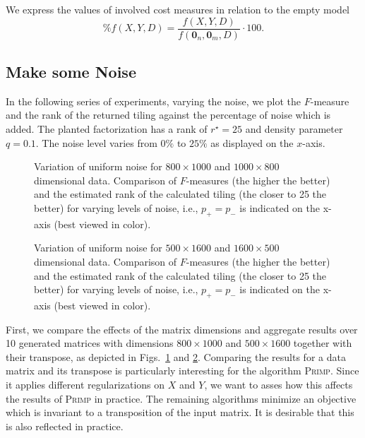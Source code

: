 We express the values of involved cost measures in relation to the empty model
\[
	\%f(X,Y,D) = \frac{f(X,Y,D)}{f(\mathbf{0}_n,\mathbf{0}_m,D)}\cdot 100.
\]
\subsection{Make some Noise}
In the following series of experiments, varying the noise, we plot the $F$-measure and the rank of the returned tiling against the percentage of noise which is added. The planted factorization has a rank of $r^\star=25$ and density parameter $q=0.1$. The noise level varies from $0\%$ to $25\%$ as displayed on the $x$-axis.  
\begin{figure}
\centering

\caption{Variation of uniform noise for $800\times 1000$ and $1000\times 800$ dimensional data. Comparison of $F$-measures (the higher the better) and the estimated rank of the calculated tiling (the closer to 25 the better) for varying levels of noise, i.e., $p_+=p_-$ is indicated on the x-axis (best viewed in color).}
\label{fig:noise810}
\end{figure}
\begin{figure}
\centering

\caption{Variation of uniform noise for $500\times 1600$ and $1600\times 500$ dimensional data. Comparison of $F$-measures (the higher the better) and the estimated rank of the calculated tiling (the closer to 25 the better) for varying levels of noise, i.e., $p_+=p_-$ is indicated on the x-axis (best viewed in color).}
\label{fig:noise516}
\end{figure}

First, we compare the effects of the matrix dimensions and aggregate results over 10 generated matrices with dimensions $800\times 1000$ and $500\times 1600$ together with their transpose, as depicted in Figs.~\ref{fig:noise810} and \ref{fig:noise516}. Comparing the results for a data matrix and its transpose is particularly interesting for the algorithm \textsc{Primp}. Since it applies different regularizations on $X$ and $Y$, we want to asses how this affects the results of \textsc{Primp} in practice. The remaining algorithms minimize an objective which is invariant to a transposition of the input matrix. It is desirable that this is also reflected in practice.

